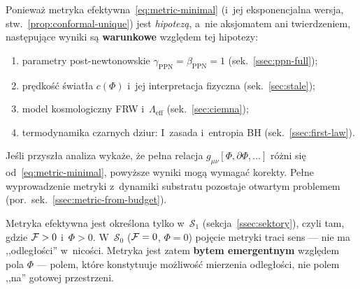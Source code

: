 \begin{remark}\label{rem:conditional-results}
Poniewa\.z metryka efektywna~\eqref{eq:metric-minimal}
(i~jej eksponencjalna wersja, stw.~\ref{prop:conformal-unique})
jest \emph{hipotez\k{a}}, a~nie aksjomatem ani twierdzeniem,
nast\k{e}puj\k{a}ce wyniki s\k{a} \textbf{warunkowe} wzgl\k{e}dem
tej hipotezy:
\begin{enumerate}[nosep]
  \item parametry post-newtonowskie $\gamma_{\mathrm{PPN}} = \beta_{\mathrm{PPN}} = 1$
        (sek.~\ref{ssec:ppn-full});
  \item pr\k{e}dko\'s\'c \'swiat\l{}a $c(\Phi)$ i~jej interpretacja
        fizyczna (sek.~\ref{sec:stale});
  \item model kosmologiczny FRW i~$\Lambda_{\mathrm{eff}}$
        (sek.~\ref{sec:ciemna});
  \item termodynamika czarnych dziur: I~zasada i~entropia BH
        (sek.~\ref{ssec:first-law}).
\end{enumerate}
Je\'sli przysz\l{}a analiza wyka\.ze, \.ze pe\l{}na relacja
$g_{\mu\nu}[\Phi,\partial\Phi,\ldots]$ r\'o\.zni si\k{e}
od~\eqref{eq:metric-minimal}, powy\.zsze wyniki mog\k{a} wymaga\'c
korekty. Pe\l{}ne wyprowadzenie metryki z~dynamiki substratu
pozostaje otwartym problemem (por.~sek.~\ref{ssec:metric-from-budget}).
\end{remark}

\begin{remark}\label{rem:metryka-F}
Metryka efektywna jest okre\'slona tylko w~$\mathcal{S}_1$
(sekcja~\ref{ssec:sektory}), czyli tam, gdzie $\mathcal{F} > 0$
i~$\Phi > 0$. W~$\mathcal{S}_0$ ($\mathcal{F} = 0$, $\Phi = 0$)
poj\k{e}cie metryki traci sens --- nie ma ,,odleg\l{}o\'sci''
w~nico\'sci. Metryka jest zatem \textbf{bytem emergentnym}
wzgl\k{e}dem pola $\Phi$ --- polem, kt\'ore konstytuuje
mo\.zliwo\'s\'c mierzenia odleg\l{}o\'sci, nie polem ,,na''
gotowej przestrzeni.
\end{remark}
